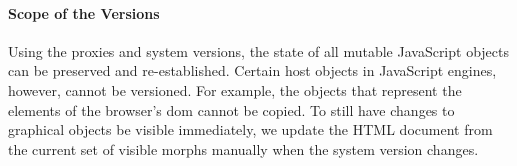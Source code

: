 % 
% 
% 




 
\paragraph{Scope of the Versions}
Using the proxies and system versions, the state of all mutable JavaScript objects can be preserved and re-established.
Certain host objects in JavaScript engines, however, cannot be versioned.
For example, the objects that represent the elements of the browser's \ac{dom} cannot be copied.
To still have changes to graphical objects be visible immediately, we update the HTML document from the current set of visible morphs manually when the system version changes.

% 













